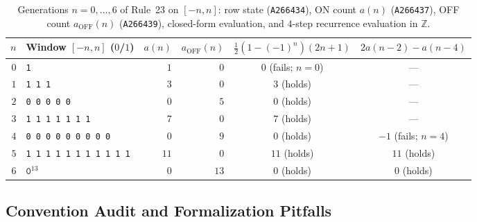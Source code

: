 \documentclass[11pt]{article}
\theoremstyle{definition}
\newcommand{\Z}{\mathbb{Z}}
\newcommand{\seq}[1]{\texttt{#1}}
\begin{document}
\begin{table}[ht]
\centering
\caption{Generations $n = 0, \dots, 6$ of Rule~23 on $[-n, n]$: row state (\seq{A266434}), ON count $a(n)$ (\seq{A266437}), OFF count $a_{\mathrm{OFF}}(n)$ (\seq{A266439}), closed-form evaluation, and $4$-step recurrence evaluation in $\Z$.}
\label{tab:small-n}
\smallskip
{\small
\begin{tabular}{@{}r l r r c c@{}}
\toprule
$n$ & Window $[-n, n]$ ($0$/$1$) & $a(n)$ & $a_{\mathrm{OFF}}(n)$ & $\frac{1}{2}(1-(-1)^n)(2n+1)$ & $2a(n-2)-a(n-4)$ \\
\midrule
$0$ & \texttt{1} & $1$ & $0$ & $0$ (fails; $n = 0$) & --- \\
$1$ & \texttt{1 1 1} & $3$ & $0$ & $3$ (holds) & --- \\
$2$ & \texttt{0 0 0 0 0} & $0$ & $5$ & $0$ (holds) & --- \\
$3$ & \texttt{1 1 1 1 1 1 1} & $7$ & $0$ & $7$ (holds) & --- \\
$4$ & \texttt{0 0 0 0 0 0 0 0 0} & $0$ & $9$ & $0$ (holds) & $-1$ (fails; $n = 4$) \\
$5$ & \texttt{1 1 1 1 1 1 1 1 1 1 1} & $11$ & $0$ & $11$ (holds) & $11$ (holds) \\
$6$ & $\mathtt{0}^{13}$ & $0$ & $13$ & $0$ (holds) & $0$ (holds) \\
\bottomrule
\end{tabular}
}
\end{table}

\subsection{Convention Audit and Formalization Pitfalls}
\label{sec:conventions}
\end{document}
